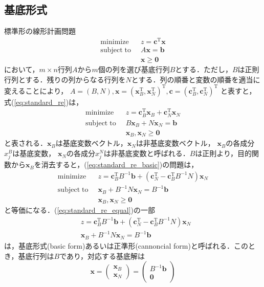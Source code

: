 \documentclass{jsreport}
\begin{document}
\subsection{基底形式}
標準形の線形計画問題
\begin{align}\label{eq:standard_re}
  \mathrm{minimize} \; \; &z = \bm{c}^{\mathrm{T}}\bm{x} \nonumber \\
  \mathrm{subject \; to} \; \; &A\bm{x} = \bm{b} \\
  &\bm{x} \geq \bm{0} \nonumber
\end{align}
において，$m \times n$行列$A$から$m$個の列を選び基底行列$B$とする．ただし，$B$は正則行列とする．残りの列からなる行列を$N$とする．列の順番と変数の順番を適当に変えることにより，
$A = (B, N), \bm{x} = (\bm{x}_B^{\mathrm{T}}, \bm{x}_{N}^{\mathrm{T}})^{\mathrm{T}}, \bm{c} = (\bm{c}_B^{\mathrm{T}}, \bm{c}_N^{\mathrm{T}})^{\mathrm{T}}$
と表すと，式(\ref{eq:standard_re})は，
\begin{align}\label{eq:standard_re_basic}
  \mathrm{minimize} \; \; &z = \bm{c}_B^{\mathrm{T}}\bm{x}_B + \bm{c}_N^{\mathrm{T}}\bm{x}_N \nonumber \\
  \mathrm{subject \; to} \; \; &B\bm{x}_B + N\bm{x}_N = \bm{b} \\
  &\bm{x}_B, \bm{x}_N \geq \bm{0} \nonumber
\end{align}
と表される．$\bm{x}_B$は基底変数ベクトル，$\bm{x}_N$は非基底変数ベクトル，
$\bm{x}_B$の各成分$x_j^B$は基底変数，
$\bm{x}_N$の各成分$x_j^N$は非基底変数と呼ばれる．$B$は正則より，目的関数から$\bm{x}_B$を消去すると，(\ref{eq:standard_re_basic})の問題は，
\begin{align}\label{eq:standard_re_equal}
  \mathrm{minimize} \; \; &z = \bm{c}_B^{\mathrm{T}}B^{-1}\bm{b} + (\bm{c}_N^{\mathrm{T}} - \bm{c}_B^{\mathrm{T}}B^{-1}N)\bm{x}_N \nonumber \\
  \mathrm{subject \; to} \; \; &\bm{x}_B + B^{-1}N\bm{x}_N = B^{-1}\bm{b} \\
  &\bm{x}_B, \bm{x}_N \geq \bm{0} \nonumber
\end{align}
と等価になる．(\ref{eq:standard_re_equal})の一部
\begin{align}\label{eq:basic_form}
  &z = \bm{c}_B^{\mathrm{T}}B^{-1}\bm{b} + (\bm{c}_N^{\mathrm{T}} - \bm{c}_B^{\mathrm{T}}B^{-1}N)\bm{x}_N \nonumber \\
  &\bm{x}_B + B^{-1}N\bm{x}_N = B^{-1}\bm{b}
\end{align}
は，基底形式(basic form)あるいは正準形(cannoncial form)と呼ばれる．このとき，基底行列は$B$であり，対応する基底解は
\begin{equation}\label{eq:basic_sol}
  \bm{x} = \left(
  \begin{array}{c}
    \bm{x}_B \\
    \bm{x}_N
  \end{array}
  \right) = \left(
  \begin{array}{c}
    B^{-1}\bm{b} \\
    \bm{0}
  \end{array}
  \right)
\end{equation}
\end{document}
